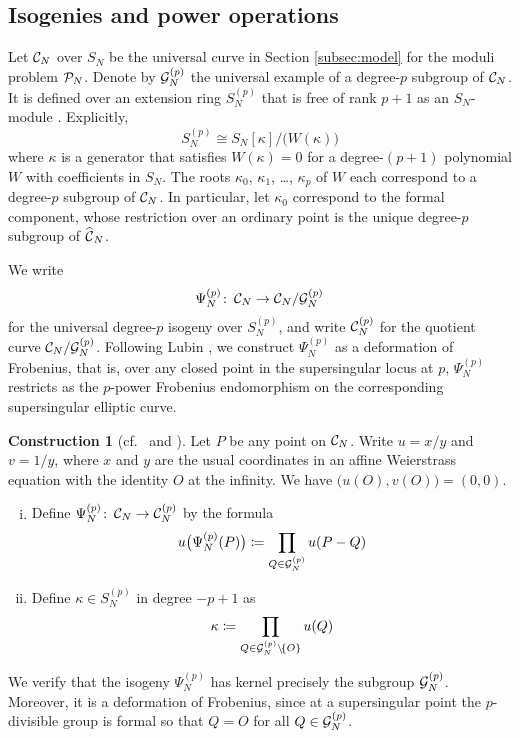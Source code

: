 \documentclass{gtpart}
\theoremstyle{definition}
\newtheorem{cstr}[thm]{Construction}
\theoremstyle{remark}
\def\co{\colon\thinspace}
\newcommand{\CC}{{\cal C}}
\newcommand{\CG}{{\cal G}}
\newcommand{\CP}{{\cal P}}
\newcommand{\HCC}{\widehat{~\!\!\CC}}
\newcommand{\K}{\kappa}
\newcommand{\ce}{\coloneqq}
\renewcommand{\=}{\approx}
\renewcommand{\-}{\sim}
\numberwithin{equation}{section}
\numberwithin{thm}{section}
\begin{document}
\subsection{Isogenies and power operations}
\label{subsec:po}

Let $\CC_N$ over $S_N$ be the universal curve in Section \ref{subsec:model} for the moduli problem $\CP_N$.  
Denote by $\CG_N^{(p)}$ the universal example of a degree-$p$ subgroup of $\CC_N$.  
It is defined over an extension ring $S_N^{(p)}$ that is free of rank $p + 1$ as an $S_N$-module \cite[Theorem 6.6.1]{KM}.  
Explicitly, 
\[
 S_N^{(p)} \cong S_N[\K] / \big(W(\K)\big) 
\]
where $\K$ is a generator that satisfies $W(\K) = 0$ for a degree-$(p + 1)$ polynomial $W$ with coefficients in $S_N$.  
The roots $\K_0$, $\K_1$, \ldots, $\K_p$ of $W$ each correspond to a degree-$p$ subgroup of $\CC_N$.  
In particular, let $\K_0$ correspond to the formal component, 
whose restriction over an ordinary point is the unique degree-$p$ subgroup of $\HCC_N$.  

We write 
\[
 \Psi_N^{(p)} \co \CC_N \to \CC_N / \CG_N^{(p)} 
\]
for the universal degree-$p$ isogeny over $S_N^{(p)}$, and write $\CC_N^{(p)}$ for the quotient curve $\CC_N / \CG_N^{(p)}$.  
Following Lubin \cite[proof of Theorem 1.4]{Lubin67}, we construct $\Psi_N^{(p)}$ as a deformation of Frobenius, 
that is, over any closed point in the supersingular locus at $p$, $\Psi_N^{(p)}$ restricts as the $p$-power Frobenius endomorphism on the corresponding supersingular elliptic curve.  
\begin{cstr}[{cf.~\cite[proof of Theorem 1.4]{Lubin67} and \cite[Section 7.7]{KM}}]
 \label{cstr}
 Let $P$ be any point on $\CC_N$.  
 Write $u = x / y$ and $v = 1 / y$, 
 where $x$ and $y$ are the usual coordinates in an affine Weierstrass equation with the identity $O$ at the infinity.  
 We have $\big( u(O), v(O) \big) = (0,0)$.  
 \begin{enumerate}[(i)]
  \item  Define $\Psi_N^{(p)} \co \CC_N \to \CC_N^{(p)}$ by the formula 
  \[
   u\big(\Psi_N^{(p)}(P)\big) \ce \prod_{Q \in \CG_N^{(p)}} u(P - Q) 
  \]

  \item  Define $\K \in S_N^{(p)}$ in degree $-p + 1$ as 
  \[
   \K \ce \prod_{Q \in \CG_N^{(p)} \setminus \! \{O\}} u(Q) 
  \]
 \end{enumerate}
\end{cstr}
We verify that the isogeny $\Psi_N^{(p)}$ has kernel precisely the subgroup $\CG_N^{(p)}$.  
Moreover, it is a deformation of Frobenius, 
since at a supersingular point the $p$-divisible group is formal so that $Q = O$ for all $Q \in \CG_N^{(p)}$.  
\end{document}
